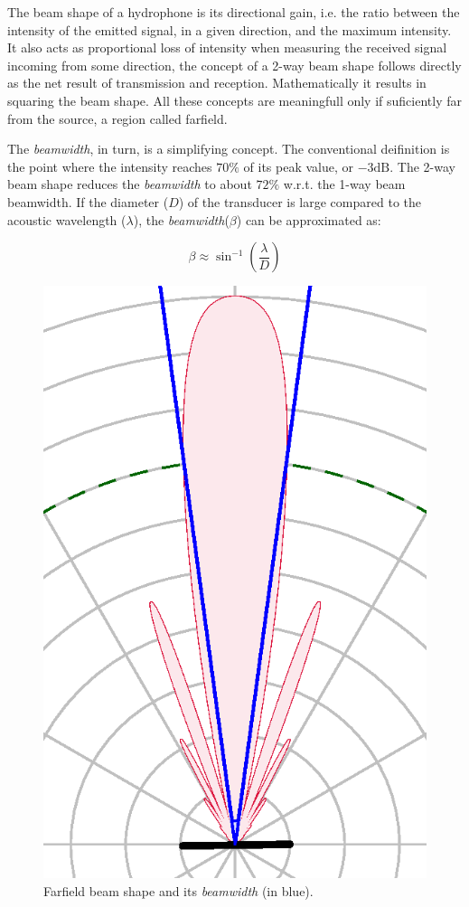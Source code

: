 The beam shape of a hydrophone is its directional gain, i.e. the ratio between
the intensity of the emitted signal, in a given direction, and the maximum
intensity. It also acts as proportional loss of intensity when measuring the
received signal incoming from some direction, the concept of a 2-way beam
shape follows directly as the net result of transmission and reception.
Mathematically it results in squaring the beam shape. All these concepts are
meaningfull only if suficiently far from the source, a region called
farfield\cite{beamwidth}.

The \textit{beamwidth}, in turn, is a simplifying concept. The conventional
deifinition is the point where the intensity reaches $70\%$ of its peak value,
or $-3\text{dB}$. The 2-way beam shape reduces the \textit{beamwidth} to about
$72\%$ w.r.t. the 1-way beam beamwidth. If the diameter ($D$) of the transducer
is large compared to the acoustic wavelength ($\lambda$), the
\textit{beamwidth}($\beta$) can be approximated as:

\[ \beta \approx \sin^{-1}\left(\frac{\lambda}{D} \right) \]

\begin{figure}[h]
	\centering
	\includegraphics[scale=0.6,trim={0.46 0.072 0.46
	1.03},clip]{Chap2/fig/directivity.eps}
	\caption{Farfield beam shape and its \textit{beamwidth} (in blue).}
	\label{fig:beamwidth}
\end{figure}

